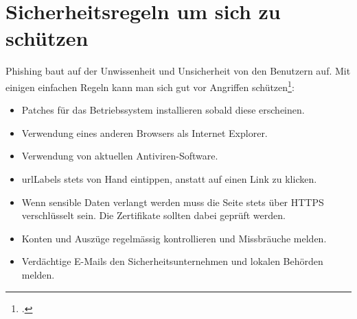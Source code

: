 \section{Sicherheitsregeln um sich zu schützen}
Phishing baut auf der Unwissenheit und Unsicherheit von den Benutzern auf. Mit einigen einfachen Regeln kann man sich gut vor Angriffen schützen\footcite{Was_ist_Phishinig_2015-05-23}:
\begin{itemize}
\item Patches für das Betriebssystem installieren sobald diese erscheinen.
\item Verwendung eines anderen Browsers als Internet Explorer.
\item Verwendung von aktuellen Antiviren-Software. 
\item \Glspl{urlLabel} stets von Hand eintippen, anstatt auf einen Link zu klicken.
\item Wenn sensible Daten verlangt werden muss die Seite stets über HTTPS verschlüsselt sein. Die Zertifikate sollten dabei geprüft werden.
\item Konten und Auszüge regelmässig kontrollieren und Missbräuche melden.
\item Verdächtige E-Mails den Sicherheitsunternehmen und lokalen Behörden melden.
\end{itemize}